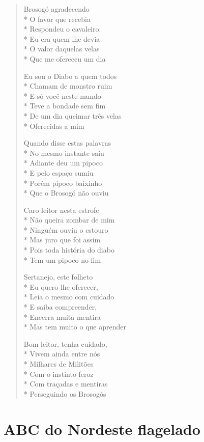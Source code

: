 \begin{verse}
Brosogó agradecendo\\*
O favor que recebia\\*
Respondeu o cavaleiro:\\*
Eu era quem lhe devia\\*
O valor daquelas velas\\*
Que me ofereceu um dia

Eu sou o Diabo a quem todos\\*
Chamam de monstro ruim\\*
E só você neste mundo\\*
Teve a bondade sem fim\\*
De um dia queimar três velas\\*
Oferecidas a mim

Quando disse estas palavras\\*
No mesmo instante saiu\\*
Adiante deu um pipoco\\*
E pelo espaço sumiu\\*
Porém pipoco baixinho\\*
Que o Brosogó não ouviu

Caro leitor nesta estrofe\\*
Não queira zombar de mim\\*
Ninguém ouviu o estouro\\*
Mas juro que foi assim\\*
Pois toda história do diabo\\*
Tem um pipoco no fim

Sertanejo, este folheto\\*
Eu quero lhe oferecer,\\*
Leia o mesmo com cuidado\\*
E saiba compreender,\\*
Encerra muita mentira\\*
Mas tem muito o que aprender

Bom leitor, tenha cuidado,\\*
Vivem ainda entre nós\\*
Milhares de Militões\\*
Com o instinto feroz\\*
Com traçadas e mentiras\\*
Perseguindo os Brosogós

\end{verse}

\chapter{ABC do Nordeste flagelado}

